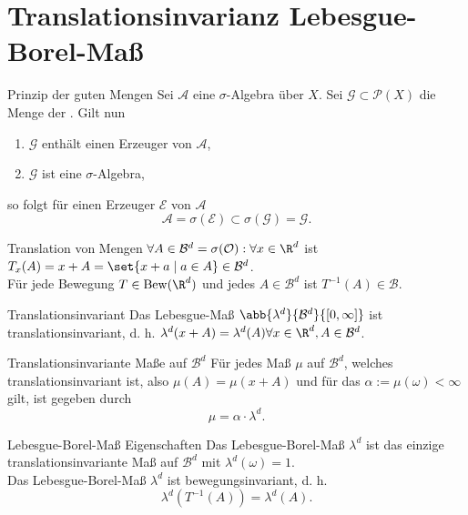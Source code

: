 \section*{Translationsinvarianz Lebesgue-Borel-Maß}

\begin{karte}{Prinzip der guten Mengen}
	Sei \( \mathcal{A} \) eine \(\sigma\)-Algebra über \(X\). Sei \( \mathcal{G} \subset \mathcal{P}(X) \) 
	die Menge der . Gilt nun 
	\begin{enumerate}
		\item \( \mathcal{G} \) enthält einen Erzeuger von \(\mathcal{A}\),
		\item \( \mathcal{G} \) ist eine \(\sigma\)-Algebra,
	\end{enumerate}
	so folgt für einen Erzeuger \( \mathcal{E} \) von \( \mathcal{A} \) 
	\[ \mathcal{A} = \sigma(\mathcal{E}) \subset \sigma(\mathcal{G}) = \mathcal{G}. \]
\end{karte}
\begin{karte}{Translation von Mengen}
	\( \forall A\in \mathcal{B}^d = \sigma(\mathcal{O}): \forall x\in \R^d \) ist 
	\( T_x(A) = x + A = \set{ x + a \;|\; a\in A } \in \mathcal{B}^d \).\\
	Für jede Bewegung \( T\in \mathrm{Bew}(\R^d) \) und jedes \(A \in \mathcal{B}^d \) ist \( T^{-1}(A) \in \mathcal{B} \).
\end{karte}
\begin{karte}{Translationsinvariant}
	Das Lebesgue-Maß \( \abb{\lambda^d}{\mathcal{B}^d}{[0,\infty]} \) ist 
	translationsinvariant, d. h. \( \lambda^d(x+A) = \lambda^d(A) \forall x\in \R^d, A\in \mathcal{B}^d \).
\end{karte}
\begin{karte}{Translationsinvariante Maße auf \(\mathcal{B}^d\)}
	Für jedes Maß \( \mu \) auf \(\mathcal{B}^d\), welches translationsinvariant ist, also 
	\( \mu(A) = \mu(x + A) \) und für das \( \alpha := \mu(\omega) < \infty \) gilt, ist gegeben durch 
	\[ \mu= \alpha \cdot \lambda^d. \]
\end{karte}
\begin{karte}{Lebesgue-Borel-Maß Eigenschaften}
	Das Lebesgue-Borel-Maß \(\lambda^d \) ist das einzige translationsinvariante Maß auf \( \mathcal{B}^d \) 
	mit \( \lambda^d(\omega) = 1 \).\\
	Das Lebesgue-Borel-Maß \( \lambda^d \) ist bewegungsinvariant, d. h. 
	\[ \lambda^d(T^{-1}(A)) = \lambda^d(A). \]
\end{karte}